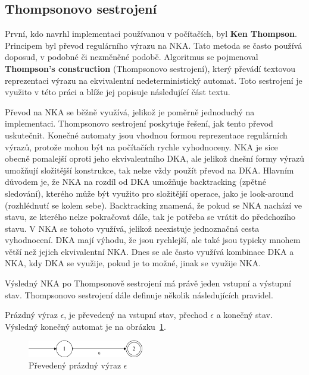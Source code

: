 \subsection*{Thompsonovo sestrojení}

První, kdo navrhl implementaci používanou v počítačích, byl \textbf{Ken Thompson}\cite{ScanToPDF}.
Principem byl převod regulárního výrazu na NKA.
Tato metoda se často používá doposud, v podobné či nezměněné podobě.
Algoritmus se pojmenoval \textbf{Thompson's construction} (Thompsonovo sestrojení), který převádí textovou reprezentaci výrazu na ekvivalentní nedeterministický automat.
Toto sestrojení je využito v této práci a blíže jej popisuje následující část textu.

Převod na NKA se běžně využívá, jelikož je poměrně jednoduchý na implementaci.
Thompsonovo sestrojení poskytuje řešení, jak tento převod uskutečnit.
Konečné automaty jsou vhodnou formou reprezentace regulárních výrazů, protože mohou být na počítačích rychle vyhodnoceny.
NKA je sice obecně pomalejší oproti jeho ekvivalentního DKA, ale jelikož dnešní formy výrazů umožňují složitější konstrukce, tak nelze vždy použít převod na DKA.
Hlavním důvodem je, že NKA na rozdíl od DKA umožňuje backtracking (zpětné sledování), kterého může být využito pro složitější operace, jako je look-around (rozhlédnutí se kolem sebe).
Backtracking znamená, že pokud se NKA nachází ve stavu, ze kterého nelze pokračovat dále, tak je potřeba se vrátit do předchozího stavu.
V NKA se tohoto využívá, jelikož neexistuje jednoznačná cesta vyhodnocení.
DKA mají výhodu, že jsou rychlejší, ale také jsou typicky mnohem větší než jejich ekvivalentní NKA.
Dnes se ale často využívá kombinace DKA a NKA, kdy DKA se využije, pokud je to možné, jinak se využije NKA.

Výsledný NKA po Thompsonově sestrojení má právě jeden vstupní a výstupní stav. 
Thompsonovo sestrojení dále definuje několik následujících pravidel.

Prázdný výraz \textit{$\epsilon$}, je převedený na vstupní stav, přechod \textit{$\epsilon$} a konečný stav.
Výsledný konečný automat je na obrázku~\ref{fig:NFAepsilon}.
\begin{figure}[!h]
	\centering
	\includegraphics[width=0.45\textwidth]{Figures/NFA_epsilon.pdf}
	\caption{Převedený prázdný výraz \textbf{$\epsilon$}}
	\label{fig:NFAepsilon}
\end{figure}

